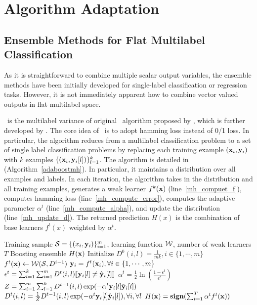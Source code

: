 {\section{Algorithm Adaptation}

%
%
\subsection{Ensemble Methods for Flat Multilabel Classification} \label{sc_emfmlc}

As it is straightforward to combine multiple scalar output variables, the ensemble methods have been initially developed for single-label classification \citep{Breiman96bagging,Freund97a} or regression  \citep{Breiman96bagging} tasks.
However, it is not immediately apparent how to combine vector valued outputs in flat multilabel space.

\adaboostmh\ is the multilabel variance of original \adaboost\ algorithm proposed by \citet{Schapire99improved}, which is further developed by \citet{Esuli2008boosting}.
The core idea of \adaboostmh\ is to adopt hamming loss instead of 0/1 loss. 
In particular, the algorithm reduces from a multilabel classification problem to a set of single label classification problems by replacing each training example $(\mathbf {x}_i,\mathbf {y}_i)$ with $k$ examples $\{(\mathbf {x}_i,\mathbf {y}_i[l])\}_{l=1}^k$.
The algorithm is detailed in (Algorithm~\ref{adaboostmh}).
In particular, it maintains a distribution over all examples and labels.
In each iteration, the algorithm takes in the distribution and all training examples, generates a weak learner $f^k(\mathbf {x})$ (line~\ref{mh_compuet_f}), computes hamming loss (line~\ref{mh_compute_error}), computes the adaptive parameter $\alpha^t$ (line~\ref{mh_compute_alpha}), and update the distribution (line~\ref{mh_update_d}).
The returned prediction $H(x)$ is the combination of base learners $f^t(x)$ weighted by $\alpha^t$.
\begin{algorithm}
\caption{\adaboostmh}
\label{adaboostmh}
\begin{algorithmic}[1]
	\REQUIRE Training sample $\mathcal{S} = \{(x_i,\mathbf {y}_i)\}_{i=1}^m$, learning function $\mathcal{W}$, number of weak learners $T$
	\ENSURE Boosting ensemble $H(\mathbf {x})$
	\STATE Initialize $D^0(i,l)=\frac{1}{mk},i\in\{1,\cdots,m\}$
		\STATE $f^t(\mathbf {x})\leftarrow\mathcal{W}(\mathcal{S},D^{i-1})$ \label{mh_compuet_f}
		\STATE $\mathbf {y}_i = f^t(\mathbf {x}_i),\forall i\in\{1,\cdots,m\}$
		\STATE $\epsilon^t =\sum_{l=1}^k\sum_{i=1}^{m}D^t(i,l){\llbracket \mathbf {y}_i[l]\neq\hat{\mathbf {y}}_i[l] \rrbracket}$ \label{mh_compute_error}
		\STATE $\alpha^{t} = \frac{1}{2}\ln\left(\frac{1-\epsilon^t}{\epsilon^t}\right)$ \label{mh_compute_alpha}
		\STATE $Z=\sum_{i=1}^{m}\sum_{l=1}^{k}D^{t-1}(i,l)\exp(-\alpha^t\mathbf {y}_i[l]\hat{\mathbf {y}}_i[l])$
		\STATE $D^t(i,l) = \frac{1}{Z}D^{t-1}(i,l)\exp(-\alpha^t\mathbf {y}_i[l]\hat{\mathbf {y}}_i[l]),\forall i,\forall l$ \label{mh_update_d}
	\ENDFOR
	\RETURN $H(\mathbf {x}) = \textbf{sign}(\sum_{t=1}^T\alpha^tf^t(\mathbf {x}))$
\end{algorithmic}
\end{algorithm}

}

